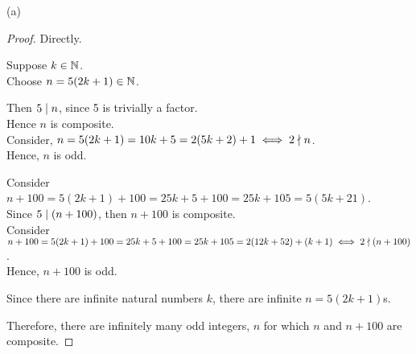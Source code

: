 \documentclass[a4paper,12pt]{report}
\begin{document}
\newpage
{}
\sol (a)
\begin{proof}
	Directly.
	\begin{list}{}{\setlength{\leftmargin}{1in}\setlength{\topsep}{0pt}}\item
		Suppose $k \in \mathbb{N}$. \\
		Choose $n=5(2k+1)\in\mathbb{N}$.

		Then $5\mathrel{\mid} n$, since 5 is trivially a factor. \\
		Hence $n$ is composite. \\
		Consider, $n = 5(2k+1) = 10k + 5 = 2(5k+2) + 1 \iff 2\mathrel{\nmid} n$. \\
		Hence, $n$ is odd. 
		
		Consider $n + 100 = 5(2k+1) + 100 = 25k+5+100 = 25k+105 = 5(5k+21)$. \\
		Since $5\mathrel{\mid}(n + 100)$, then $n+100$ is composite. \\
		Consider $n + 100 = 5(2k+1) + 100 = 25k+5+100 = 25k+105 = 2(12k+52)+(k+1) \iff 2\mathrel{\nmid}(n+100)$. \\
		Hence, $n+100$ is odd.

		Since there are infinite natural numbers $k$, there are infinite $n=5(2k+1)$s.
	\end{list}
	Therefore, there are infinitely many odd integers, $n$ for which $n$ and $n+100$ are composite.	
\end{proof}
\end{document}
